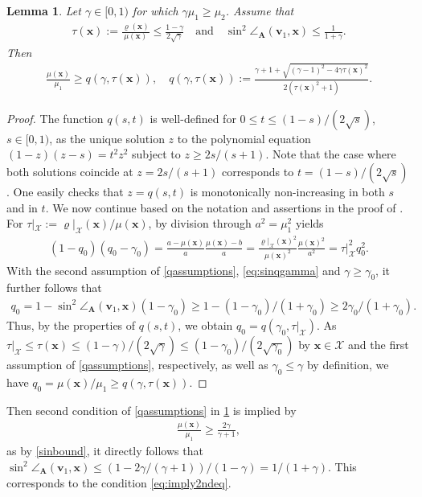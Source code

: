 \documentclass[a4paper,11pt,oneside]{amsart}
\newtheorem{lemma}[theorem]{Lemma}
\theoremstyle{definition}
\theoremstyle{remark}
\newcommand{\ten}[1]{\boldsymbol{#1}}
\numberwithin{equation}{section}
\numberwithin{theorem}{section}
\begin{document}
\begin{appendix}
\begin{lemma}\label{qbound}
%
%
%
%
%
 Let $\gamma \in [0,1)$ for which $\gamma \mu_1 \geq \mu_2$. Assume that 
 \begin{align}\label{qassumptions}
  \tau(\ten x) := \frac{\varrho(\ten x)}{\mu(\ten x)} \leq \frac{1 - \gamma}{2 \sqrt{\gamma}} 
 \quad \text{and}\quad  \sin^2 \angle_{\ten A}(\ten{v}_1,\ten x) \leq \frac{1}{1+\gamma}.
 \end{align}
 Then
 \begin{align*}
  \frac{\mu(\ten x)}{\mu_1} \geq q(\gamma, \tau(\ten x)), \quad q(\gamma, \tau(\ten x)) := \frac{\gamma + 1 + \sqrt{ (\gamma - 1)^2 -4\gamma \tau(\ten x)^2}}{2 (\tau(\ten x)^2 + 1)}.
 \end{align*}
\end{lemma}
%
\begin{proof}
The function $q(s,t)$ is well-defined for $0 \leq t \leq (1-s)/(2\sqrt{s})$, $s \in [0,1)$, as
the unique solution $z$ to the polynomial equation $(1-z)(z-s) = t^2 z^2$ subject to $z \geq 2s/(s+1)$. Note that the case where both solutions coincide at $z = 2s/(s+1)$ corresponds to $t = (1-s)/(2\sqrt{s})$.
One easily checks that $z = q(s,t)$ is monotonically non-increasing in both $s$ and in $t$. We now continue based on the notation and assertions in the proof of . 
For $\tau|_\mathcal{X} := \varrho|_\mathcal{X}(\ten x) / \mu(\ten x)$,  by division through $a^2 = \mu_1^2$  yields 
\begin{align*}
 (1-q_0)(q_0-\gamma_0) = \frac{a - \mu(\ten x)}{a} \frac{\mu(\ten x) - b}{a} = \frac{\varrho|_\mathcal{X}(\ten x)^2}{\mu(\ten x)^2} \frac{\mu(\ten x)^2}{a^2} = \tau|_\mathcal{X}^2 q_0^2. %
\end{align*}
With the second assumption of \cref{qassumptions}, \cref{eq:sinqgamma} and $\gamma \geq \gamma_0$, it further follows that 
\begin{align*}
 q_0 = 1 - \sin^2 \angle_{\ten A}(\ten{v}_1,\ten x) (1-\gamma_0) \geq 1 - (1-\gamma_0) / (1+\gamma_0) \geq 2\gamma_0 / (1+\gamma_0).
\end{align*}
Thus, by the properties of $q(s,t)$, we obtain $q_0 = q(\gamma_0, \tau|_{\mathcal{X}})$. 
%
%
%
%
%
%
%
%
%
%
%
%
%
As $\tau|_\mathcal{X} \leq \tau(\ten x) \leq (1-\gamma)/(2\sqrt{\gamma}) \leq (1-\gamma_0)/(2\sqrt{\gamma_0})$ by $\ten x \in \mathcal{X}$ and the first assumption of \cref{qassumptions}, respectively, as well as $\gamma_0 \leq \gamma$ by definition, we have $q_0 = \mu(\ten x)/\mu_1 \geq q(\gamma,\tau(\ten x))$. 
%
%
\end{proof}
%
Then second condition of \cref{qassumptions} in \cref{qbound} is implied by 
%
 \begin{align}\label{gammacoresp}
  \frac{\mu(\ten x)}{\mu_1} \geq \frac{2\gamma}{\gamma + 1}, %
 \end{align}
%
%
 as by \cref{sinbound}, it directly follows that $\sin^2 \angle_{\ten A}(\ten{v}_1,\ten x) \leq (1-2\gamma/(\gamma + 1))/(1-\gamma) = 1/(1+\gamma)$. This corresponds to the condition \cref{eq:imply2ndeq}.
%





\end{appendix}
\end{document}
